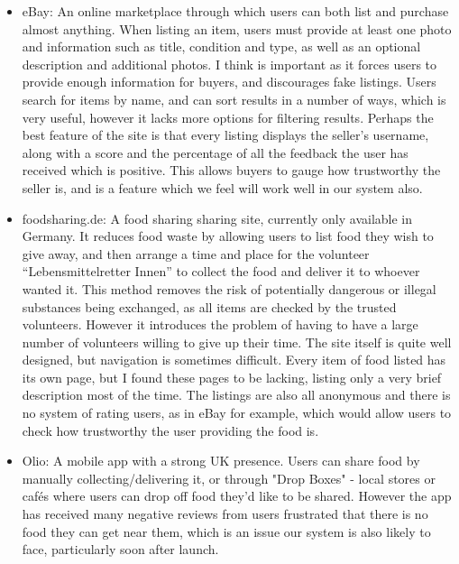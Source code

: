 \documentclass[12pt]{article}
\begin{document}
\begin{itemize}

    \item eBay: An online marketplace through which users can both list and purchase almost anything. When listing an item, users must provide at least one photo and information such as title, condition and type, as well as an optional description and additional photos. I think is important as it forces users to provide enough information for buyers, and discourages fake listings. Users search for items by name, and can sort results in a number of ways, which is very useful, however it lacks more options for filtering results. Perhaps the best feature of the site is that every listing displays the seller’s username, along with a score and the percentage of all the feedback the user has received which is positive. This allows buyers to gauge how trustworthy the seller is, and is a feature which we feel will work well in our system also.


    \item foodsharing.de: A food sharing sharing site, currently only available in Germany. It reduces food waste by allowing users to list food they wish to give away, and then arrange a time and place for the volunteer “Lebensmittelretter Innen” to collect the food and deliver it to whoever wanted it. This method removes the risk of potentially dangerous or illegal substances being exchanged, as all items are checked by the trusted volunteers. However it introduces the problem of having to have a large number of volunteers willing to give up their time. The site itself is quite well designed, but navigation is sometimes difficult. Every item of food listed has its own page, but I found these pages to be lacking, listing only a very brief description most of the time. The listings are also all anonymous and there is no system of rating users, as in eBay for example, which would allow users to check how trustworthy the user providing the food is.
    
    \item Olio: A mobile app with a strong UK presence. Users can share food by manually collecting/delivering it, or through "Drop Boxes" - local stores or cafés where users can drop off food they'd like to be shared. However the app has received many negative reviews from users frustrated that there is no food they can get near them, which is an issue our system is also likely to face, particularly soon after launch.

\end{itemize}
\end{document}

